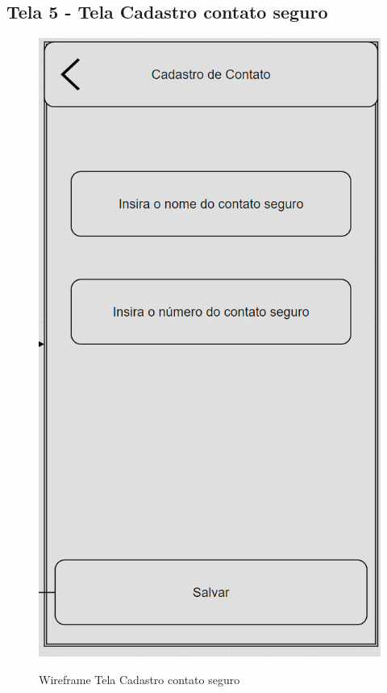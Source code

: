 \subsection{Tela 5 - Tela Cadastro contato seguro}
\begin{figure}[h]
  \begin{center}
  \includegraphics[width=0.7\linewidth]{images/wire-tela-cadsatro-contato-seguro.png}\\
  \end{center}
  \caption[Wireframe Tela Cadastro contato seguro]{Wireframe Tela Cadastro contato seguro}
  \label{fig:wireframe-tela-cadastro-contato-seguro}
\end{figure}
\clearpage
